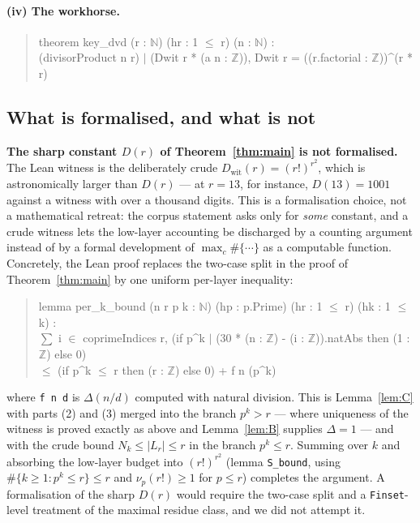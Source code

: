 \documentclass[11pt]{article}
\theoremstyle{plain}
\theoremstyle{definition}
\theoremstyle{remark}
\numberwithin{equation}{section}
\newcommand{\N}{\mathbb{N}}
\newcommand{\Z}{\mathbb{Z}}
\newcommand{\Lr}{L_r}
\begin{document}
\paragraph{(iv) The workhorse.}
\begin{quote}\ttfamily\small
theorem key\_dvd (r : $\N$) (hr : 1 $\le$ r) (n : $\N$) :\\
\hspace*{2em}(divisorProduct n r) $\mid$ (Dwit r * (a n : $\Z$)),
\qquad
Dwit r = ((r.factorial : $\Z$))\^{}(r * r)
\end{quote}

\subsection{What is formalised, and what is not}
\label{sec:formal-gap}

\textbf{The sharp constant $D(r)$ of Theorem~\ref{thm:main} is not formalised.} The Lean witness
is the deliberately crude $D_{\mathrm{wit}}(r) = (r!)^{r^2}$, which is astronomically larger than
$D(r)$ --- at $r=13$, for instance, $D(13) = 1001$ against a witness with over a thousand digits.
This is a formalisation choice, not a mathematical retreat: the corpus statement asks only for
\emph{some} constant, and a crude witness lets the low-layer accounting be discharged by a
counting argument instead of by a formal development of $\max_c\#\{\cdots\}$ as a computable
function. Concretely, the Lean proof replaces the two-case split in the proof of
Theorem~\ref{thm:main} by one uniform per-layer inequality:
\begin{quote}\ttfamily\small
lemma per\_k\_bound (n r p k : $\N$) (hp : p.Prime) (hr : 1 $\le$ r) (hk : 1 $\le$ k) :\\
\hspace*{2em}$\sum$ i $\in$ coprimeIndices r, (if p\^{}k $\mid$ (30 * (n : $\Z$) - (i : $\Z$)).natAbs then (1 : $\Z$) else 0)\\
\hspace*{4em}$\le$ (if p\^{}k $\le$ r then (r : $\Z$) else 0) + f n (p\^{}k)
\end{quote}
where \texttt{f n d} is $\Delta(n/d)$ computed with natural division. This is Lemma~\ref{lem:C}
with parts (2) and (3) merged into the branch $p^k > r$ --- where uniqueness of the witness is
proved exactly as above and Lemma~\ref{lem:B} supplies $\Delta = 1$ --- and with the crude bound
$N_k \le |\Lr| \le r$ in the branch $p^k \le r$. Summing over $k$ and absorbing the low-layer
budget into $(r!)^{r^2}$ (lemma \texttt{S\_bound}, using $\#\{k \ge 1: p^k \le r\} \le r$ and
$\nu_p(r!) \ge 1$ for $p \le r$) completes the argument. A formalisation of the sharp $D(r)$ would
require the two-case split and a \texttt{Finset}-level treatment of the maximal residue class,
and we did not attempt it.
\end{document}
